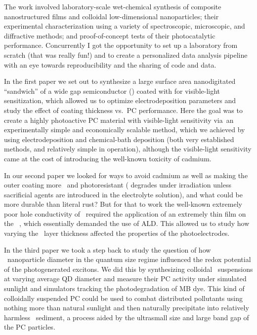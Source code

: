 \documentclass[webedition,openright,titles,swedish,english]{LuaUUThesis}\usepackage[]{graphicx}\usepackage[]{xcolor}
\newcommand{\via}{via}
\newcommand{\vs}{vs.}
\begin{document}
The work involved laboratory-scale wet-chemical synthesis
of composite nanostructured films and colloidal low-dimensional nanoparticles;
their experimental characterization using a variety of spectroscopic, microscopic,
and diffractive methods;
and proof-of-concept tests of their photocatalytic performance.
Concurrently I got the opportunity to set up a laboratory from scratch (that was really fun!)
and to create a personalized data analysis pipeline with an eye towards
reproducibility and the sharing of code and data.

In the first paper
we set out to synthesize a large surface area nanodigitated 
\enquote{sandwich} of a wide gap semiconductor (\ZnO) coated with 
for visible-light sensitization, which allowed us to optimize electrodeposition
parameters and study the effect of  coating thickness \vs\ \gls{PC} performance.
Here the goal was to create a highly photoactive \gls{PC} material with visible-light sensitivity
\via\ an experimentally simple and economically scalable method, which we
achieved by using electrodeposition and chemical-bath deposition (both very
established methods, and relatively simple in operation), although the visible-light
sensitivity came at the cost of introducing the well-known toxicity of cadmium.

In our second paper we
looked for ways to avoid cadmium as well as making the outer coating
more \pH\ and photoresistant ( degrades under irradiation unless sacrificial
agents are introduced in the electrolyte solution), and what could be more
durable than literal rust?
But for that to work the well-known extremely poor hole conductivity of \hematite\
required the application of an extremely thin film on the \ZnO\ ,
which essentially demanded the use of \gls{ALD}.
This allowed us to study how varying the \hematite\ layer thickness affected
the properties of the photoelectrodes.

In the third paper
we took a step back to study the question of how \ZnO\ nanoparticle
diameter in the quantum size regime influenced the redox potential
of the photogenerated excitons.
We did this by synthesizing colloidal \zincox\ suspensions at varying
average \gls{QD} diameter and measure their \gls{PC} activity under
simulated sunlight and simulators tracking the photodegradation of \gls{MB} dye.
This kind of colloidally suspended \gls{PC} could be used to
combat distributed pollutants using nothing more than natural sunlight and
then naturally precipitate into relatively harmless \ZnO\ sediment, a process
aided by the ultrasmall size and large band gap of the \gls{PC} particles.
\end{document}
